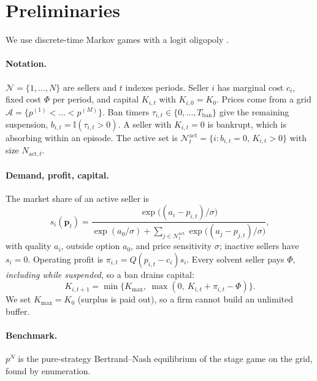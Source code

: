 \documentclass{article}
\newcommand{\Nact}{N_{\mathrm{act},t}}
\newcommand{\Tban}{T_{\mathrm{ban}}}
\begin{document}
\section{Preliminaries}
\label{sec:prelim}

We use discrete-time Markov games \citep{littman1994} with a logit oligopoly \citep{mcfadden1974,anderson1992}.

\paragraph{Notation.} $\mathcal{N}=\{1,\dots,N\}$ are sellers and $t$ indexes periods. Seller $i$ has marginal cost $c_i$, fixed cost $\Phi$ per period, and capital $K_{i,t}$ with $K_{i,0}=K_0$. Prices come from a grid $\mathcal{A}=\{p^{(1)}<\dots<p^{(M)}\}$. Ban timers $\tau_{i,t}\in\{0,\dots,\Tban\}$ give the remaining suspension, $b_{i,t}=\mathbb{I}(\tau_{i,t}>0)$. A seller with $K_{i,t}=0$ is bankrupt, which is absorbing within an episode. The active set is $\mathcal{N}^{\mathrm{act}}_t=\{i: b_{i,t}=0,\,K_{i,t}>0\}$ with size $\Nact$.

\paragraph{Demand, profit, capital.} The market share of an active seller is
\begin{equation}
s_i(\mathbf p_t)=\frac{\exp\!\big((a_i-p_{i,t})/\sigma\big)}{\exp(a_0/\sigma)+\sum_{j\in\mathcal N^{\mathrm{act}}_t}\exp\!\big((a_j-p_{j,t})/\sigma\big)},
\end{equation}
with quality $a_i$, outside option $a_0$, and price sensitivity $\sigma$; inactive sellers have $s_i=0$. Operating profit is $\pi_{i,t}=Q(p_{i,t}-c_i)s_i$. Every solvent seller pays $\Phi$, \emph{including while suspended}, so a ban drains capital:
\begin{equation}
K_{i,t+1}=\min\{K_{\max},\ \max(0,\ K_{i,t}+\pi_{i,t}-\Phi)\}.
\end{equation}
We set $K_{\max}=K_0$ (surplus is paid out), so a firm cannot build an unlimited buffer.

\paragraph{Benchmark.} $p^N$ is the pure-strategy Bertrand--Nash equilibrium of the stage game on the grid, found by enumeration.
\end{document}
